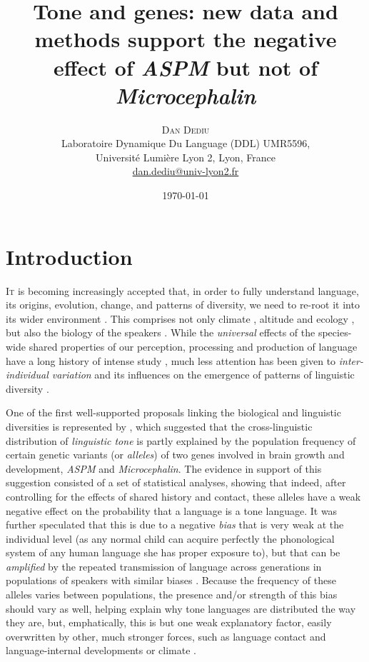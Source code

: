 \documentclass[twoside,onecolumn]{article}
\title{Tone and genes: new data and methods support the negative effect of \textit{ASPM} but not of \textit{Microcephalin}} %
\author{%
\textsc{Dan Dediu} \\[1ex] %
\normalsize Laboratoire Dynamique Du Language (DDL) UMR5596,\\
\normalsize Université Lumière Lyon 2, Lyon, France \\ %
\normalsize \href{mailto:dan.dediu@univ-lyon2.fr}{dan.dediu@univ-lyon2.fr} %
}
\date{\today} %
\begin{document}
\maketitle


\section{Introduction}

\lettrine[nindent=0em,lines=2]{I} t is becoming increasingly accepted that, in order to fully understand language, its origins, evolution, change, and patterns of diversity, we need to re-root it into its wider environment \citep{dediu_language_2017,blasi_human_2019,everett_language_2016}.
This comprises not only climate \citep{everett_language_2016}, altitude \citep{everett_evidence_2013} and ecology \citep{bentz_evolution_2018}, but also the biology of the speakers \citep{dediu_language_2017}.
While the \emph{universal} effects of the species-wide shared properties of our perception, processing and production of language have a long history of intense study \citet{christiansen_language_2008,ohala_sound_1989,yu_origins_2013}, much less attention has been given to \emph{inter-individual variation} and its influences on the emergence of patterns of linguistic diversity \citep{dediu_language_2017}.

One of the first well-supported proposals linking the biological and linguistic diversities is represented by \citet{dediu_ladd_2007}, which suggested that the cross-linguistic distribution of \emph{linguistic tone} is partly explained by the population frequency of certain genetic variants (or \emph{alleles}) of two genes involved in brain growth and development, \textit{ASPM} and \textit{Microcephalin}.
The evidence in support of this suggestion consisted of a set of statistical analyses, showing that indeed, after controlling for the effects of shared history and contact, these alleles have a weak negative effect on the probability that a language is a tone language.
It was further speculated that this is due to a negative \emph{bias} that is very weak at the individual level (as any normal child can acquire perfectly the phonological system of any human language she has proper exposure to), but that can be \emph{amplified} by the repeated transmission of language across generations in populations of speakers with similar biases \citet{dediu_ladd_2007,ladd_bioling_2008,dediu_humbiol_2011}.
Because the frequency of these alleles varies between populations, the presence and/or strength of this bias should vary as well, helping explain why tone languages are distributed the way they are, but, emphatically, this is but one weak explanatory factor, easily overwritten by other, much stronger forces, such as language contact and language-internal developments \citep{hombert_tone_1979,yip_tone_2002,hombert_towards_1975} or climate \citep{everett_language_2016}.
\end{document}
